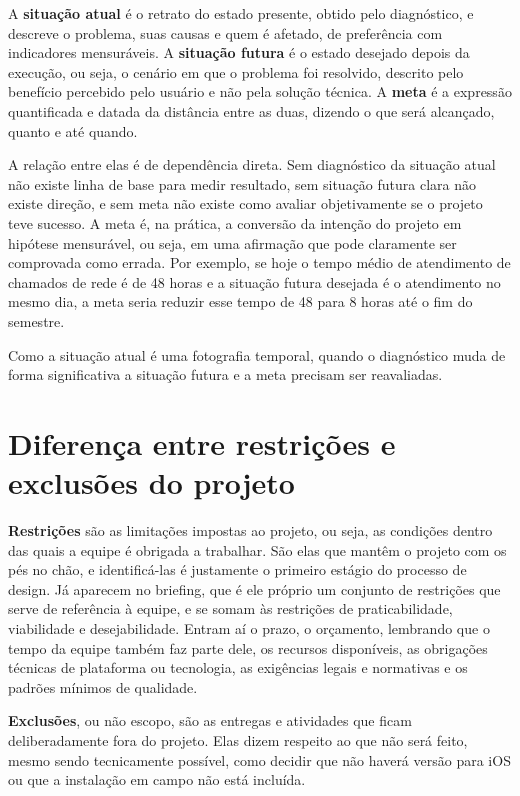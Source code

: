 \documentclass[11pt]{ifscarticle}
\begin{document}
A \textbf{situação atual} é o retrato do estado presente, obtido pelo
diagnóstico, e descreve o problema, suas causas e quem é afetado, de
preferência com indicadores mensuráveis. A \textbf{situação futura} é o
estado desejado depois da execução, ou seja, o cenário em que o problema foi
resolvido, descrito pelo benefício percebido pelo usuário e não pela solução
técnica. A \textbf{meta} é a expressão quantificada e datada da distância
entre as duas, dizendo o que será alcançado, quanto e até quando.

A relação entre elas é de dependência direta. Sem diagnóstico da situação
atual não existe linha de base para medir resultado, sem situação futura
clara não existe direção, e sem meta não existe como avaliar objetivamente
se o projeto teve sucesso. A meta é, na prática, a conversão da intenção do
projeto em hipótese mensurável, ou seja, em uma afirmação que pode
claramente ser comprovada como errada. Por exemplo, se hoje o tempo médio de
atendimento de chamados de rede é de 48 horas e a situação futura desejada é
o atendimento no mesmo dia, a meta seria reduzir esse tempo de 48 para 8
horas até o fim do semestre.

Como a situação atual é uma fotografia temporal, quando o diagnóstico muda
de forma significativa a situação futura e a meta precisam ser reavaliadas.

\section{Diferença entre restrições e exclusões do projeto}

\textbf{Restrições} são as limitações impostas ao projeto, ou seja, as
condições dentro das quais a equipe é obrigada a trabalhar. São elas que
mantêm o projeto com os pés no chão, e identificá-las é justamente o
primeiro estágio do processo de design. Já aparecem no briefing, que é ele
próprio um conjunto de restrições que serve de referência à equipe, e se
somam às restrições de praticabilidade, viabilidade e desejabilidade.
Entram aí o prazo, o orçamento, lembrando que o tempo da equipe também faz
parte dele, os recursos disponíveis, as obrigações técnicas de plataforma ou
tecnologia, as exigências legais e normativas e os padrões mínimos de
qualidade.

\textbf{Exclusões}, ou não escopo, são as entregas e atividades que ficam
deliberadamente fora do projeto. Elas dizem respeito ao que não será feito,
mesmo sendo tecnicamente possível, como decidir que não haverá versão para
iOS ou que a instalação em campo não está incluída.
\end{document}
